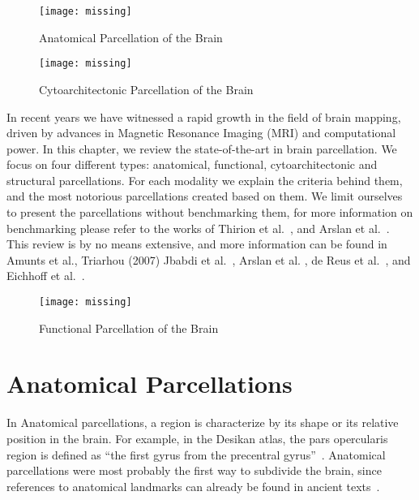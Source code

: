 \begin{figure}[h!]
    \texttt{[image: missing]}
    \caption{Anatomical Parcellation of the Brain}
    \label{fig:brain_function}
\end{figure}

\begin{figure*}[t!]
    \texttt{[image: missing]}
    \caption{Cytoarchitectonic Parcellation of the Brain}
    \label{fig:brain_function}
\end{figure*}

In recent years we have witnessed a rapid growth in the field of brain mapping,
driven by advances in Magnetic Resonance Imaging (MRI) and computational power.
In this chapter, we review the state-of-the-art in brain parcellation. We focus
on four different types: anatomical, functional, cytoarchitectonic and structural
parcellations. For each modality we explain the criteria behind them, and the
most notorious parcellations created based on them. We limit ourselves to present
the parcellations without benchmarking them, for more information on benchmarking
please refer to the works of Thirion et al.~\cite{Thirion2014}, and Arslan et al.~\cite{Arslan2018}.
This review is by no means extensive, and more information can be found in
Amunts et al.\cite{Amunts2007}, Triarhou (2007)\cite{Triarhou2007} 
Jbabdi et al.~\cite{Jbabdi2013}, Arslan et al. \cite{Arslan2018},
de Reus et al.~\cite{DeReus2013}, and Eichhoff et al.~\cite{Eickhoff2015, Eickhoff2018a}.



\begin{figure*}[t!]
    \texttt{[image: missing]}
    \caption{Functional Parcellation of the Brain}
    \label{fig:brain_function}
\end{figure*}

\section{Anatomical Parcellations}
\label{sec:anatomical}

In Anatomical parcellations, a region is characterize by its shape or its
relative position in the brain. For example, in the Desikan atlas, the pars
opercularis region is defined as ``the first gyrus from the precentral
gyrus''~\cite{Desikan2006}. Anatomical parcellations were most probably the first
way to subdivide the brain, since references to anatomical landmarks can already
be found in ancient texts~\cite{Elsberg1945, Collice2008}.

